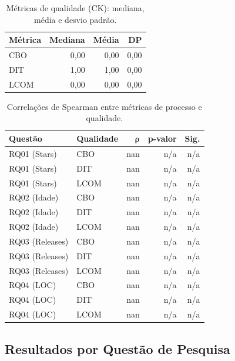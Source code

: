 \documentclass[10pt,a4paper,twocolumn]{article}
\begin{document}
\begin{table}[H]
  \centering
  \caption{Métricas de qualidade (CK): mediana, média e desvio padrão.}
  \label{tab:quality}
  \begin{tabular}{lrrr}
    \toprule
    \textbf{Métrica} & \textbf{Mediana} & \textbf{Média} & \textbf{DP} \\
    \midrule
    CBO  & 0,00  & 0,00  & 0,00 \\
    DIT  & 1,00  & 1,00  & 0,00 \\
    LCOM & 0,00 & 0,00 & 0,00 \\
    \bottomrule
  \end{tabular}
\end{table}

\begin{table}[t]
  \centering
  \caption{Correlações de Spearman entre métricas de processo e qualidade.}
  \label{tab:corr}
  \begin{tabular}{llrrr}
    \toprule
    \textbf{Questão} & \textbf{Qualidade} &
    $\boldsymbol{\rho}$ & \textbf{p-valor} & \textbf{Sig.} \\
    \midrule
        RQ01 (Stars) & CBO & nan & n/a & n/a \\
        RQ01 (Stars) & DIT & nan & n/a & n/a \\
        RQ01 (Stars) & LCOM & nan & n/a & n/a \\
        RQ02 (Idade) & CBO & nan & n/a & n/a \\
        RQ02 (Idade) & DIT & nan & n/a & n/a \\
        RQ02 (Idade) & LCOM & nan & n/a & n/a \\
        RQ03 (Releases) & CBO & nan & n/a & n/a \\
        RQ03 (Releases) & DIT & nan & n/a & n/a \\
        RQ03 (Releases) & LCOM & nan & n/a & n/a \\
        RQ04 (LOC) & CBO & nan & n/a & n/a \\
        RQ04 (LOC) & DIT & nan & n/a & n/a \\
        RQ04 (LOC) & LCOM & nan & n/a & n/a \\
    \bottomrule
  \end{tabular}
\end{table}

\subsection{Resultados por Questão de Pesquisa}
\end{document}
